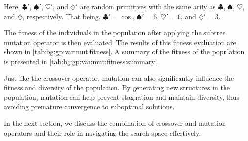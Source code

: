   Here, \(\clubsuit'\), \(\spadesuit'\), \(\heartsuit'\), and \(\diamondsuit'\)
  are random primitives with the same arity as \(\clubsuit\), \(\spadesuit\),
  \(\heartsuit\), and \(\diamondsuit\), respectively.
  That being, \(\clubsuit' = \cos\), \(\spadesuit' = 6\), \(\heartsuit' = 6\),
  and \(\diamondsuit' = 3\).

  The fitness of the individuals in the population after applying the subtree 
  mutation operator is then evaluated.
  The results of this fitness evaluation are shown in 
  \vref{tab:bg:gp:var:mut:fitness}.
  A summary of the fitness of the population is presented in 
  \vref{tab:bg:gp:var:mut:fitness:summary}.


Just like the crossover operator, mutation can also significantly influence 
the fitness and diversity of the population. By generating new structures 
in the population, mutation can help prevent stagnation and maintain diversity, 
thus avoiding premature convergence to suboptimal solutions.

In the next section, we discuss the combination of crossover and mutation 
operators and their role in navigating the search space effectively.
